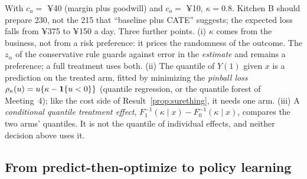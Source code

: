 \documentclass[11pt]{article}
\begin{document}
With $c_u = $ ¥40 (margin plus goodwill) and $c_o = $ ¥10, $\kappa = 0.8$. Kitchen B should prepare 230, not the 215 that
``baseline plus CATE'' suggests; the expected loss falls from ¥375 to ¥150 a day. Three further points. (i) $\kappa$ comes from the
business, not from a risk preference: it prices the randomness of the outcome. The $z_\alpha$ of the conservative rule
guards against error in the \emph{estimate} and remains a preference; a full treatment uses both. (ii) The quantile of
$Y(1)$ given $x$ is a prediction on the treated arm, fitted by minimizing the \emph{pinball loss}
$\rho_\kappa(u) = u\{\kappa - \mathbf{1}\{u < 0\}\}$ (quantile regression, or the quantile forest of Meeting~4); like the cost side of
Result~\ref{prop:surething}, it needs one arm. (iii) A \emph{conditional quantile treatment effect},
$F_1^{-1}(\kappa \mid x) - F_0^{-1}(\kappa \mid x)$, compares the two arms' quantiles. It is not the quantile of individual effects,
and neither decision above uses it.

\subsection{From predict-then-optimize to policy learning}
\end{document}
